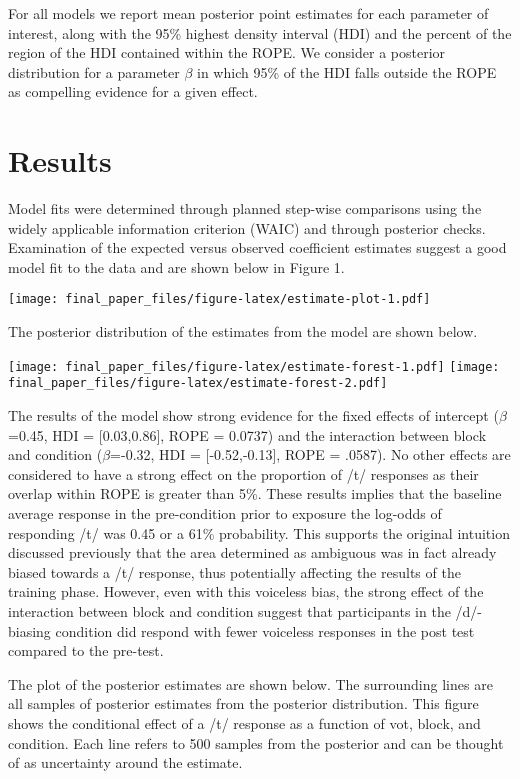 \documentclass[
  english,
  man]{apa6}
\begin{document}
For all models we report mean posterior point estimates for each parameter of interest, along with the 95\% highest density interval (HDI) and the percent of the region of the HDI contained within the ROPE. We consider a posterior distribution for a parameter \(\beta\) in which 95\% of the HDI falls outside the ROPE as compelling evidence for a given effect.

\hypertarget{results}{%
\section{Results}\label{results}}

Model fits were determined through planned step-wise comparisons using the widely applicable information criterion (WAIC) and through posterior checks. Examination of the expected versus observed coefficient estimates suggest a good model fit to the data and are shown below in Figure 1.

\texttt{[image: final\_paper\_files/figure-latex/estimate-plot-1.pdf]}

The posterior distribution of the estimates from the model are shown below.

\texttt{[image: final\_paper\_files/figure-latex/estimate-forest-1.pdf]} \texttt{[image: final\_paper\_files/figure-latex/estimate-forest-2.pdf]}

The results of the model show strong evidence for the fixed effects of intercept (\(\beta\)=0.45, HDI = {[}0.03,0.86{]}, ROPE = 0.0737) and the interaction between block and condition (\(\beta\)=-0.32, HDI = {[}-0.52,-0.13{]}, ROPE = .0587). No other effects are considered to have a strong effect on the proportion of /t/ responses as their overlap within ROPE is greater than 5\%. These results implies that the baseline average response in the pre-condition prior to exposure the log-odds of responding /t/ was 0.45 or a 61\% probability. This supports the original intuition discussed previously that the area determined as ambiguous was in fact already biased towards a /t/ response, thus potentially affecting the results of the training phase. However, even with this voiceless bias, the strong effect of the interaction between block and condition suggest that participants in the /d/-biasing condition did respond with fewer voiceless responses in the post test compared to the pre-test.

The plot of the posterior estimates are shown below. The surrounding lines are all samples of posterior estimates from the posterior distribution. This figure shows the conditional effect of a /t/ response as a function of vot, block, and condition. Each line refers to 500 samples from the posterior and can be thought of as uncertainty around the estimate.
\end{document}
